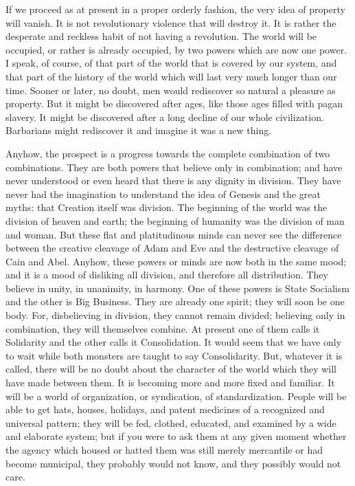\documentclass{book}
\begin{document}
If we proceed as at present in a proper orderly fashion, the very idea of property will vanish. It is not revolutionary violence that will destroy it. It is rather the desperate and reckless habit of not having a revolution. The world will be occupied, or rather is already occupied, by two powers which are now one power. I speak, of course, of that part of the world that is covered by our system, and that part of the history of the world which will last very much longer than our time. Sooner or later, no doubt, men would rediscover so natural a pleasure as property. But it might be discovered after ages, like those ages filled with pagan slavery. It might be discovered after a long decline of our whole civilization. Barbarians might rediscover it and imagine it was a new thing.

Anyhow, the prospect is a progress towards the complete combination of two combinations. They are both powers that believe only in combination; and have never understood or even heard that there is any dignity in division. They have never had the imagination to understand the idea of Genesis and the great myths: that Creation itself was division. The beginning of the world was the division of heaven and earth; the beginning of humanity was the division of man and woman. But these flat and platitudinous minds can never see the difference between the creative cleavage of Adam and Eve and the destructive cleavage of Cain and Abel. Anyhow, these powers or minds are now both in the same mood; and it is a mood of disliking all division, and therefore all distribution. They believe in unity, in unanimity, in harmony. One of these powers is State Socialism and the other is Big Business. They are already one spirit; they will soon be one body. For, disbelieving in division, they cannot remain divided; believing only in combination, they will themselves combine. At present one of them calls it Solidarity and the other calls it Consolidation. It would seem that we have only to wait while both monsters are taught to say Consolidarity. But, whatever it is called, there will be no doubt about the character of the world which they will have made between them. It is becoming more and more fixed and familiar. It will be a world of organization, or syndication, of standardization. People will be able to get hats, houses, holidays, and patent medicines of a recognized and universal pattern; they will be fed, clothed, educated, and examined by a wide and elaborate system; but if you were to ask them at any given moment whether the agency which housed or hatted them was still merely mercantile or had become municipal, they probably would not know, and they possibly would not care.
\end{document}
